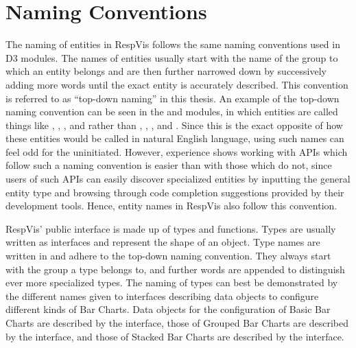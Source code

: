 \section{Naming Conventions}
\label{sec:NamingConventions}

The naming of entities in RespVis follows the same naming conventions
used in D3 modules. The names of entities usually start with the name
of the group to which an entity belongs and are then further narrowed
down by successively adding more words until the exact entity is
accurately described. This convention is referred to as
\enquote{top-down naming} in this thesis. An example of the top-down
naming convention can be seen in the 
\parencite{D3Scale} and  \parencite{D3Axis} modules, in
which entities are called things like ,
, , and  rather
than , , , and
. Since this is the exact opposite of how these
entities would be called in natural English language, using such names
can feel odd for the uninitiated. However, experience shows working
with APIs which follow such a naming convention is easier than with
those which do not, since users of such APIs can easily discover
specialized entities by inputting the general entity type and browsing
through code completion suggestions provided by their development
tools. Hence, entity names in RespVis also follow this convention.

RespVis' public interface is made up of types and functions. Types
are usually written as interfaces and represent the shape of an
object. Type names are written in 
\parencite{PascalCase} and adhere to the top-down naming
convention. They always start with the group a type belongs to, and
further words are appended to distinguish ever more specialized
types. The naming of types can best be demonstrated by the different
names given to interfaces describing data objects to configure
different kinds of Bar Charts. Data objects for the configuration of
Basic Bar Charts are described by the  interface, those
of Grouped Bar Charts are described by the 
interface, and those of Stacked Bar Charts are described by the
 interface.

